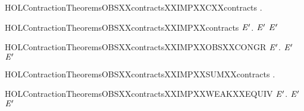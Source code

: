 \newcommand{\HOLContractionTheoremsOBSXXcontractsXXEPSYY}{\UseVerbatim{HOLContractionTheoremsOBSXXcontractsXXEPSYY}}
\begin{SaveVerbatim}{HOLContractionTheoremsOBSXXcontractsXXIMPXXCXXcontracts}
\HOLTokenTurnstile{} \HOLSymConst{\HOLTokenForall{}} .    \HOLSymConst{\HOLTokenImp{}}   
\end{SaveVerbatim}
\newcommand{\HOLContractionTheoremsOBSXXcontractsXXIMPXXCXXcontracts}{\UseVerbatim{HOLContractionTheoremsOBSXXcontractsXXIMPXXCXXcontracts}}
\begin{SaveVerbatim}{HOLContractionTheoremsOBSXXcontractsXXIMPXXcontracts}
\HOLTokenTurnstile{} \HOLSymConst{\HOLTokenForall{}} \ensuremath{\HOLBoundVar{E}\sp{\prime}}.   \ensuremath{\HOLBoundVar{E}\sp{\prime}} \HOLSymConst{\HOLTokenImp{}}   \ensuremath{\HOLBoundVar{E}\sp{\prime}}
\end{SaveVerbatim}
\newcommand{\HOLContractionTheoremsOBSXXcontractsXXIMPXXcontracts}{\UseVerbatim{HOLContractionTheoremsOBSXXcontractsXXIMPXXcontracts}}
\begin{SaveVerbatim}{HOLContractionTheoremsOBSXXcontractsXXIMPXXOBSXXCONGR}
\HOLTokenTurnstile{} \HOLSymConst{\HOLTokenForall{}} \ensuremath{\HOLBoundVar{E}\sp{\prime}}.   \ensuremath{\HOLBoundVar{E}\sp{\prime}} \HOLSymConst{\HOLTokenImp{}}   \ensuremath{\HOLBoundVar{E}\sp{\prime}}
\end{SaveVerbatim}
\newcommand{\HOLContractionTheoremsOBSXXcontractsXXIMPXXOBSXXCONGR}{\UseVerbatim{HOLContractionTheoremsOBSXXcontractsXXIMPXXOBSXXCONGR}}
\begin{SaveVerbatim}{HOLContractionTheoremsOBSXXcontractsXXIMPXXSUMXXcontracts}
\HOLTokenTurnstile{} \HOLSymConst{\HOLTokenForall{}} .    \HOLSymConst{\HOLTokenImp{}}   
\end{SaveVerbatim}
\newcommand{\HOLContractionTheoremsOBSXXcontractsXXIMPXXSUMXXcontracts}{\UseVerbatim{HOLContractionTheoremsOBSXXcontractsXXIMPXXSUMXXcontracts}}
\begin{SaveVerbatim}{HOLContractionTheoremsOBSXXcontractsXXIMPXXWEAKXXEQUIV}
\HOLTokenTurnstile{} \HOLSymConst{\HOLTokenForall{}} \ensuremath{\HOLBoundVar{E}\sp{\prime}}.   \ensuremath{\HOLBoundVar{E}\sp{\prime}} \HOLSymConst{\HOLTokenImp{}}   \ensuremath{\HOLBoundVar{E}\sp{\prime}}
\end{SaveVerbatim}
